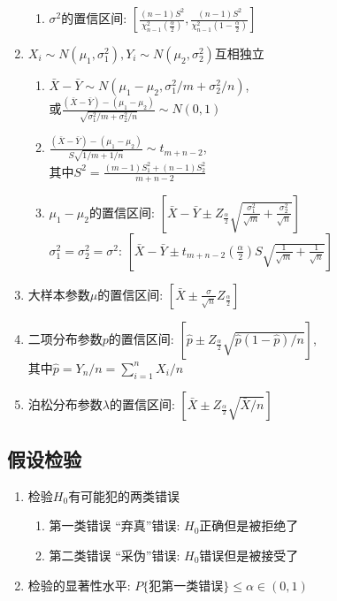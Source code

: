 \documentclass[10pt,a4paper,nofonts]{ctexart}
\renewcommand{\le}{\leqslant}
\begin{document}
\begin{multicols}{2}
\begin{enumerate}
\begin{enumerate}
\item $\sigma^2$的置信区间: $[\frac{(n-1)S^2}{\chi_{n-1}^2(\frac{\alpha}{2})},\frac{(n-1)S^2}{\chi_{n-1}^2(1-\frac{\alpha}{2})}]$
\end{enumerate}
\item $X_i\sim N(\mu_1,\sigma_1^2), Y_i\sim N(\mu_2,\sigma_2^2)$互相独立
\begin{enumerate}
\item $\bar{X}-\bar{Y}\sim N(\mu_1-\mu_2,\sigma_1^2/m+\sigma_2^2/n)$,\\
或$\frac{(\bar{X}-\bar{Y})-(\mu_1-\mu_2)}{\sqrt{\sigma_1^2/m+\sigma_2^2/n}}\sim N(0,1)$
\item $\frac{(\bar{X}-\bar{Y})-(\mu_1-\mu_2)}{S\sqrt{1/m+1/n}}\sim t_{m+n-2}$,\\
其中$S^2=\frac{(m-1)S_1^2+(n-1)S_2^2}{m+n-2}$
\item $\mu_1-\mu_2$的置信区间: $[\bar{X}-\bar{Y}\pm Z_{\frac{\alpha}{2}}\sqrt{\frac{\sigma_1^2}{\sqrt{m}}+\frac{\sigma_2^2}{\sqrt{n}}}]$\\
$\sigma_1^2=\sigma_2^2=\sigma^2$: $[\bar{X}-\bar{Y}\pm t_{m+n-2}{(\frac{\alpha}{2})}S\sqrt{\frac{1}{\sqrt{m}}+\frac{1}{\sqrt{n}}}]$
\end{enumerate}
\item 大样本参数$\mu$的置信区间: $[\bar{X}\pm\frac{\sigma}{\sqrt{n}}Z_{\frac{\alpha}{2}}]$
\item 二项分布参数$p$的置信区间: $[\hat{p}\pm Z_{\frac{\alpha}{2}}\sqrt{\hat{p}(1-\hat{p})/n}]$,\\
其中$\hat{p}=Y_n/n=\sum_{i=1}^n X_i/n$
\item 泊松分布参数$\lambda$的置信区间: $[\bar{X}\pm Z_{\frac{\alpha}{2}}\sqrt{\bar{X}/n}]$
\end{enumerate}

\subsection{假设检验}

\begin{enumerate}
\item 检验$H_0$有可能犯的两类错误
\begin{enumerate}
\item 第一类错误 “弃真”错误: $H_0$正确但是被拒绝了
\item 第二类错误 “采伪”错误: $H_0$错误但是被接受了
\end{enumerate}
\item 检验的显著性水平: $P\{\text{犯第一类错误}\}\le\alpha\in(0,1)$
\end{enumerate}


\end{multicols}
\end{document}
